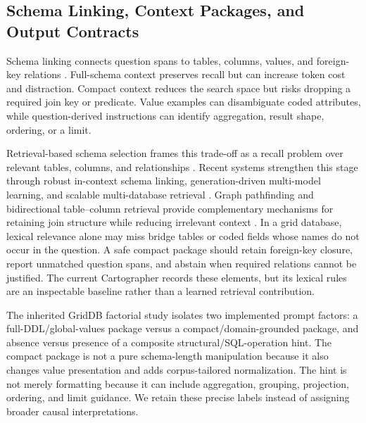 \documentclass[applsci,article,submit,moreauthors]{Definitions/mdpi}
\begin{document}
\subsection{Schema Linking, Context Packages, and Output Contracts}

Schema linking connects question spans to tables, columns, values, and foreign-key relations \cite{wang2020ratsql,lei2020reexamining,liu2022semantic}. Full-schema context preserves recall but can increase token cost and distraction. Compact context reduces the search space but risks dropping a required join key or predicate. Value examples can disambiguate coded attributes, while question-derived instructions can identify aggregation, result shape, ordering, or a limit.

Retrieval-based schema selection frames this trade-off as a recall problem over relevant tables, columns, and relationships \cite{bozdemir2026schema}. Recent systems strengthen this stage through robust in-context schema linking, generation-driven multi-model learning, and scalable multi-database retrieval \cite{liu2025solidsql,hao2025genlink,wang2025linkalign}. Graph pathfinding and bidirectional table--column retrieval provide complementary mechanisms for retaining join structure while reducing irrelevant context \cite{safdarian2026schemagraphsql,nahid2026bidirectional}. In a grid database, lexical relevance alone may miss bridge tables or coded fields whose names do not occur in the question. A safe compact package should retain foreign-key closure, report unmatched question spans, and abstain when required relations cannot be justified. The current Cartographer records these elements, but its lexical rules are an inspectable baseline rather than a learned retrieval contribution.

The inherited GridDB factorial study isolates two implemented prompt factors: a full-DDL/global-values package versus a compact/domain-grounded package, and absence versus presence of a composite structural/SQL-operation hint. The compact package is not a pure schema-length manipulation because it also changes value presentation and adds corpus-tailored normalization. The hint is not merely formatting because it can include aggregation, grouping, projection, ordering, and limit guidance. We retain these precise labels instead of assigning broader causal interpretations.
\end{document}
